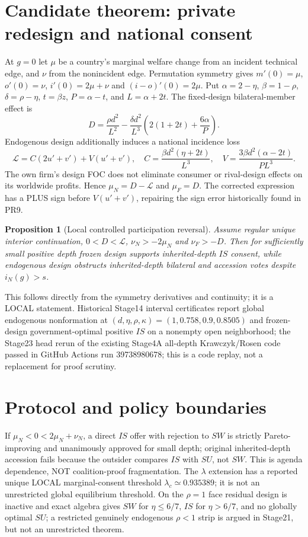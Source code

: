 \documentclass[11pt,a4paper]{article}
\newtheorem{proposition}{Proposition}
\begin{document}
\section{Candidate theorem: private redesign and national consent}
At $g=0$ let $\mu$ be a country's marginal welfare change from an incident technical edge, and $\nu$ from the nonincident edge. Permutation symmetry gives $m'(0)=\mu$, $o'(0)=\nu$, $i'(0)=2\mu+\nu$ and $(i-o)'(0)=2\mu$. Put $\alpha=2-\eta$, $\beta=1-\rho$, $\delta=\rho-\eta$, $t=\beta z$, $P=\alpha-t$, and $L=\alpha+2t$. The fixed-design bilateral-member effect is
\[
 D=\frac{\rho d^2}{L^2}-\frac{\delta d^2}{L^3}\left(2(1+2t)+\frac{6\alpha}{P}\right).
\]
Endogenous design additionally induces a national incidence loss
\[
 \mathcal L=C(2u'+v')+V(u'+v'),\quad C=\frac{\beta d^2(\eta+2t)}{L^3},\quad
 V=\frac{3\beta d^2(\alpha-2t)}{P L^3}.
\]
The own firm's design FOC does not eliminate consumer or rival-design effects on its worldwide profits. Hence $\mu_N=D-\mathcal L$ and $\mu_F=D$. The corrected expression has a PLUS sign before $V(u'+v')$, repairing the sign error historically found in PR9.
\begin{proposition}[Local controlled participation reversal]
Assume regular unique interior continuation, $0<D<\mathcal L$, $\nu_N>-2\mu_N$ and $\nu_F>-D$. Then for sufficiently small positive depth frozen design supports inherited-depth $IS$ consent, while endogenous design obstructs inherited-depth bilateral and accession votes despite $i_N(g)>s$.
\end{proposition}
This follows directly from the symmetry derivatives and continuity; it is a LOCAL statement. Historical Stage14 interval certificates report global endogenous nonformation at $(d,\eta,\rho,\kappa)=(1,0.758,0.9,0.8505)$ and frozen-design government-optimal positive $IS$ on a nonempty open neighborhood; the Stage23 head rerun of the existing Stage4A all-depth Krawczyk/Rosen code passed in GitHub Actions run 39738980678; this is a code replay, not a replacement for proof scrutiny.

\section{Protocol and policy boundaries}
If $\mu_N<0<2\mu_N+\nu_N$, a direct $IS$ offer with rejection to $SW$ is strictly Pareto-improving and unanimously approved for small depth; original inherited-depth accession fails because the outsider compares $IS$ with $SU$, not $SW$. This is agenda dependence, NOT coalition-proof fragmentation. The $\lambda$ extension has a reported unique LOCAL marginal-consent threshold $\lambda_c\simeq0.935389$; it is not an unrestricted global equilibrium threshold. On the $\rho=1$ face residual design is inactive and exact algebra gives $SW$ for $\eta\le6/7$, $IS$ for $\eta>6/7$, and no globally optimal $SU$; a restricted genuinely endogenous $\rho<1$ strip is argued in Stage21, but not an unrestricted theorem.
\end{document}
